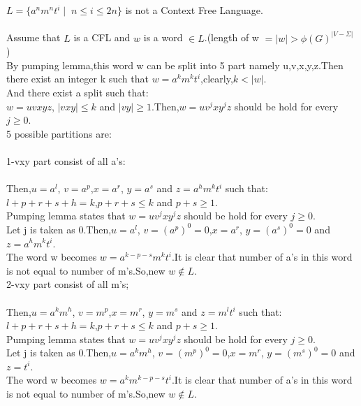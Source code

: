 \documentclass[a4paper,12pt]{article}
\begin{document}
\begin{tcolorbox}

$L=\{a^n m^n t^i \mid \; n\leq i \leq 2n\}$ is not a Context Free Language.\\\\

Assume that $L$ is a CFL and $w$ is a word $\in L$.(length of w $=|w|>\phi(G)^{|V-\Sigma|}$ )\\By pumping lemma,this word w can be split into 5 part namely u,v,x,y,z.Then there exist an integer k such that
$w=a^km^kt^i$,clearly,$k<|w|$.\\And there exist a split such that:\\
$w=uvxyz$, $|vxy|\leq k$ and $|vy|\geq 1$.Then,$w=uv^jxy^jz$ should be hold for every $j\geq 0$.\\5 possible partitions are:\\\\
1-vxy part consist of all a's:\\\\
Then,$u=a^l$, $v=a^p$,$x=a^r$, $y=a^s$ and $z=a^hm^kt^i$ such that:\\
$l+p+r+s+h=k$,$p+r+s\leq k$ and $p+s\geq 1$.\\
Pumping lemma states that $w=uv^jxy^jz$ should be hold for every $j\geq 0$.\\
Let j is taken as 0.Then,$u=a^l$, $v={(a^p)}^0=0$,$x=a^r$, $y={(a^s)}^0=0$ and $z=a^hm^kt^i$.\\The word w becomes $w=a^{k-p-s}m^kt^i$.It is clear that number of a's in this word is not equal to number of m's.So,new $w \notin L$.\\  

2-vxy part consist of all m's;\\\\
Then,$u=a^km^h$, $v=m^p$,$x=m^r$, $y=m^s$ and $z=m^lt^i$ such that:\\
$l+p+r+s+h=k$,$p+r+s\leq k$ and $p+s\geq 1$.\\
Pumping lemma states that $w=uv^jxy^jz$ should be hold for every $j\geq 0$.\\
Let j is taken as 0.Then,$u=a^km^h$, $v={(m^p)}^0=0$,$x=m^r$, $y={(m^s)}^0=0$ and $z=t^i$.\\The word w becomes $w=a^km^{k-p-s}t^i$.It is clear that number of a's in this word is not equal to number of m's.So,new $w \notin L$.\\


\end{tcolorbox}
\end{document}
